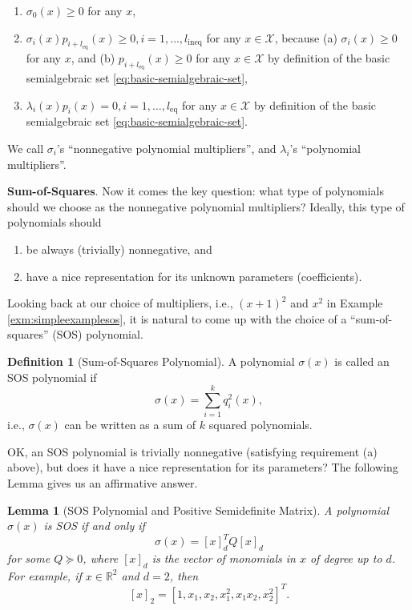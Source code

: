 \documentclass[
]{book}
\newtheorem{lemma}{Lemma}[chapter]
\theoremstyle{definition}
\newtheorem{definition}{Definition}[chapter]
\theoremstyle{definition}
\theoremstyle{definition}
\theoremstyle{definition}
\theoremstyle{remark}
\begin{document}
\begin{enumerate}
\def\labelenumi{\arabic{enumi}.}
\item
  \(\sigma_0(x) \geq 0\) for any \(x\),
\item
  \(\sigma_i(x) p_{i+l_{\mathrm{eq}}}(x) \geq 0, i=1,\dots,l_{\mathrm{ineq}}\) for any \(x \in \mathcal{X}\), because (a) \(\sigma_i(x) \geq 0\) for any \(x\), and (b) \(p_{i+l_{\mathrm{eq}}}(x) \geq 0\) for any \(x \in \mathcal{X}\) by definition of the basic semialgebraic set \eqref{eq:basic-semialgebraic-set},
\item
  \(\lambda_i(x) p_i (x) = 0, i=1,\dots,l_{\mathrm{eq}}\) for any \(x \in \mathcal{X}\) by definition of the basic semialgebraic set \eqref{eq:basic-semialgebraic-set}.
\end{enumerate}

We call \(\sigma_i\)'s ``nonnegative polynomial multipliers'', and \(\lambda_i\)'s ``polynomial multipliers''.

\textbf{Sum-of-Squares}. Now it comes the key question: what type of polynomials should we choose as the nonnegative polynomial multipliers? Ideally, this type of polynomials should

\begin{enumerate}
\def\labelenumi{\alph{enumi}.}
\item
  be always (trivially) nonnegative, and
\item
  have a nice representation for its unknown parameters (coefficients).
\end{enumerate}

Looking back at our choice of multipliers, i.e., \((x+1)^2\) and \(x^2\) in Example \ref{exm:simpleexamplesos}, it is natural to come up with the choice of a ``sum-of-squares'' (SOS) polynomial.

\begin{definition}[Sum-of-Squares Polynomial]
\protect\hypertarget{def:sumofsquarespolynomial}{}\label{def:sumofsquarespolynomial}A polynomial \(\sigma(x)\) is called an SOS polynomial if
\[
\sigma(x) = \sum_{i=1}^k q_i^2(x),
\]
i.e., \(\sigma(x)\) can be written as a sum of \(k\) squared polynomials.
\end{definition}

OK, an SOS polynomial is trivially nonnegative (satisfying requirement (a) above), but does it have a nice representation for its parameters? The following Lemma gives us an affirmative answer.

\begin{lemma}[SOS Polynomial and Positive Semidefinite Matrix]
\protect\hypertarget{lem:psdrepresentationsospolynomial}{}\label{lem:psdrepresentationsospolynomial}A polynomial \(\sigma(x)\) is SOS if and only if
\[
\sigma(x) = [x]_d^T Q [x]_d
\]
for some \(Q \succeq 0\), where \([x]_d\) is the vector of monomials in \(x\) of degree up to \(d\). For example, if \(x \in \mathbb{R}^2\) and \(d = 2\), then
\[
[x]_2 = [1,x_1,x_2,x_1^2,x_1x_2,x_2^2]^T.
\]
\end{lemma}
\end{document}

